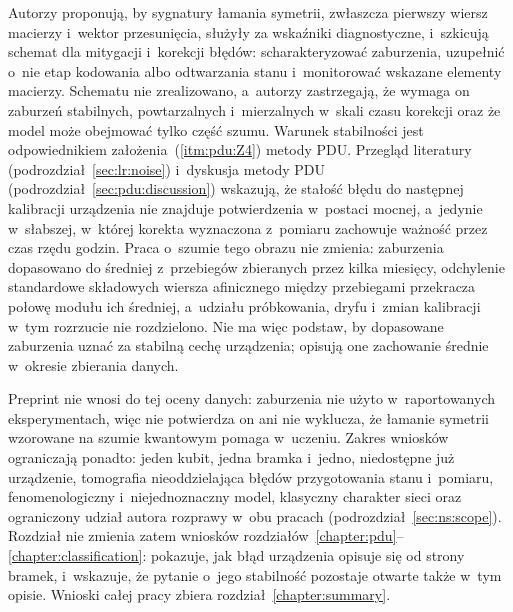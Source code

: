 Autorzy proponują, by sygnatury łamania symetrii, zwłaszcza pierwszy wiersz macierzy i~wektor przesunięcia, służyły za wskaźniki diagnostyczne, i~szkicują schemat dla mitygacji i~korekcji błędów: scharakteryzować zaburzenia, uzupełnić o~nie etap kodowania albo odtwarzania stanu i~monitorować wskazane elementy macierzy.
Schematu nie zrealizowano, a~autorzy zastrzegają, że wymaga on zaburzeń stabilnych, powtarzalnych i~mierzalnych w~skali czasu korekcji oraz że model może obejmować tylko część szumu.
Warunek stabilności jest odpowiednikiem założenia~(\ref{itm:pdu:Z4}) metody PDU.
Przegląd literatury (podrozdział~\ref{sec:lr:noise}) i~dyskusja metody PDU (podrozdział~\ref{sec:pdu:discussion}) wskazują, że stałość błędu do następnej kalibracji urządzenia nie znajduje potwierdzenia w~postaci mocnej, a~jedynie w~słabszej, w~której korekta wyznaczona z~pomiaru zachowuje ważność przez czas rzędu godzin.
Praca o~szumie tego obrazu nie zmienia: zaburzenia dopasowano do średniej z~przebiegów zbieranych przez kilka miesięcy, odchylenie standardowe składowych wiersza afinicznego między przebiegami przekracza połowę modułu ich średniej, a~udziału próbkowania, dryfu i~zmian kalibracji w~tym rozrzucie nie rozdzielono.
Nie ma więc podstaw, by dopasowane zaburzenia uznać za stabilną cechę urządzenia; opisują one zachowanie średnie w~okresie zbierania danych.

Preprint nie wnosi do tej oceny danych: zaburzenia nie użyto w~raportowanych eksperymentach, więc nie potwierdza on ani nie wyklucza, że łamanie symetrii wzorowane na szumie kwantowym pomaga w~uczeniu.
Zakres wniosków ograniczają ponadto: jeden kubit, jedna bramka i~jedno, niedostępne już urządzenie, tomografia nieoddzielająca błędów przygotowania stanu i~pomiaru, fenomenologiczny i~niejednoznaczny model, klasyczny charakter sieci oraz ograniczony udział autora rozprawy w~obu pracach (podrozdział~\ref{sec:ns:scope}).
Rozdział nie zmienia zatem wniosków rozdziałów~\ref{chapter:pdu}--\ref{chapter:classification}: pokazuje, jak błąd urządzenia opisuje się od strony bramek, i~wskazuje, że pytanie o~jego stabilność pozostaje otwarte także w~tym opisie.
Wnioski całej pracy zbiera rozdział~\ref{chapter:summary}.
